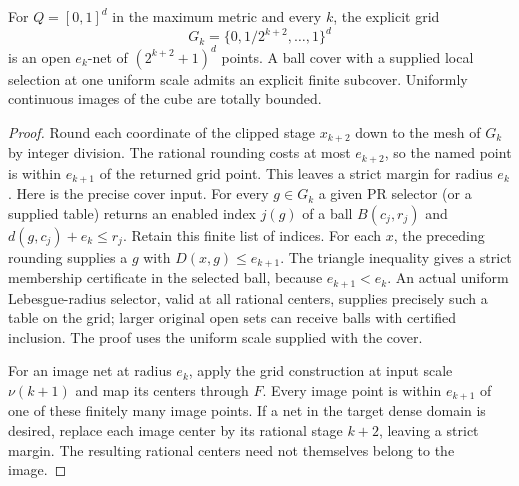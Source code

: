 \begin{theorem}\label{idx-metric166}
For $Q=[0,1]^d$ in the maximum metric and every $k$, the explicit grid
\[
 G_k=\{0,1/2^{k+2},\ldots,1\}^d
\]
is an open $e_k$-net of $(2^{k+2}+1)^d$ points. A ball cover with a
supplied local selection at one uniform scale admits an explicit finite
subcover. Uniformly continuous images of the cube are totally bounded.
\end{theorem}
\begin{proof}
Round each coordinate of the clipped stage $x_{k+2}$ down to the mesh of
$G_k$ by integer division. The rational rounding costs at most $e_{k+2}$,
so the named point is within $e_{k+1}$ of the returned grid point. This
leaves a strict margin for radius $e_k$.
Here is the precise cover input. For every $g\in G_k$ a given PR selector
(or a supplied table) returns an enabled index $j(g)$ of a ball $B(c_j,r_j)$
and $d(g,c_j)+e_k\le r_j$. Retain this finite list of indices. For each
$x$, the preceding rounding supplies a $g$ with $D(x,g)\le e_{k+1}$.
The triangle inequality gives a strict membership certificate in the selected
ball, because $e_{k+1}<e_k$. An actual uniform Lebesgue-radius selector,
valid at all rational centers, supplies precisely such a table on the grid;
larger original open sets can receive balls with certified inclusion.
The proof uses the uniform scale supplied with the cover.

For an image net at radius $e_k$, apply the grid construction at input scale
$\nu(k+1)$ and map its centers through $F$. Every image point is within
$e_{k+1}$ of one of these finitely many image points. If a net in the target
dense domain is desired, replace each image center by its rational stage
$k+2$, leaving a strict margin. The resulting rational centers need not
themselves belong to the image.
\end{proof}

